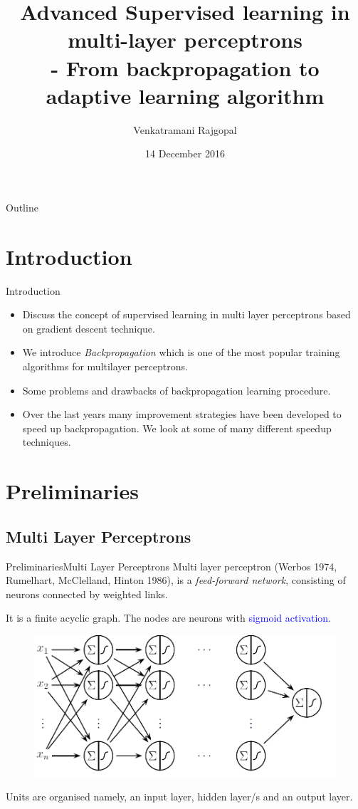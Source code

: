 \documentclass{beamer}
\title{Advanced Supervised learning in \\ 
	multi-layer perceptrons \\-  From backpropagation to adaptive learning algorithm}
\author{Venkatramani Rajgopal}
\institute[] 
{\	Department of Mathematics\\
		University of Applied Sciences, Mittweida}
\date{14 December 2016}
\begin{document}
\begin{frame}
\titlepage
\end{frame}

\begin{frame}{Outline}
\tableofcontents
\end{frame}	


\section{Introduction}
\begin{frame}{Introduction}
\begin{itemize}
\item Discuss the concept of supervised learning in multi layer perceptrons based on gradient descent technique.  	
\item We introduce \textit{Backpropagation} which is one of the most popular training algorithms for multilayer perceptrons. 
\item Some problems and drawbacks of backpropagation learning procedure. 
\item Over the last years many improvement strategies have been developed to speed up backpropagation. We look at some of many different speedup techniques. 


\end{itemize}	

	
\end{frame}	


\section{Preliminaries}
\subsection{Multi Layer Perceptrons}
\begin{frame}{Preliminaries}{Multi Layer Perceptrons}
Multi layer perceptron (Werbos 1974, Rumelhart, McClelland, Hinton 1986), is a \textit{feed-forward network}, consisting of neurons connected by weighted links. 

It is a finite acyclic graph. The nodes are neurons with \textcolor{blue}{sigmoid activation}.

\begin{figure}
\centering
\includegraphics[width=0.5\linewidth]{mlp}
\end{figure}

Units are organised namely, an input layer, hidden layer/s and an output layer. 

\end{frame}
\end{document}
